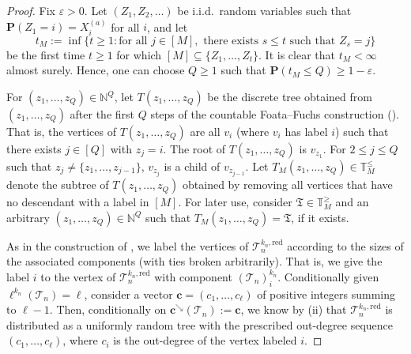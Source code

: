 \documentclass{article}
\theoremstyle{remark}
\newcommand{\bN}{\mathbb{N}}
\newcommand{\bT}{\mathbb{T}}
\newcommand{\cT}{\mathcal{T}}
\newcommand{\fT}{\mathfrak{T}}
\newcommand{\bc}{\mathbf{c}}
\newcommand{\prob}[1]{\mathbf{P}{\left(#1\right)}}
\newcommand{\red}{\mathrm{red}}
\begin{document}
\begin{proof}
Fix $\varepsilon>0$. 
Let $(Z_1,Z_2,\ldots)$ be i.i.d.\ random variables such that $\prob{Z_1=i}=X_i^{(a)}$ for all $i$, and let 
\[
    t_M := \inf\{ t \geq 1 : \text{for all } j \in [M], \text{ there exists } s \leq t \text{ such that } Z_s= j \}
\] 
be the first time $t \geq 1$ for which $[M] \subseteq \{Z_1,\ldots,Z_t\}$. 
It is clear that $t_M<\infty$ almost surely. 
Hence, one can choose $Q \geq 1$ such that $\prob{t_M \leq Q} \geq 1-\varepsilon$.

For $(z_1,\ldots,z_Q) \in \bN^Q$, let $T(z_1,\ldots,z_Q)$ be the discrete tree obtained from $(z_1,\ldots,z_Q)$ after the first $Q$ steps of the countable Foata--Fuchs construction (). 
That is, the vertices of $T(z_1,\ldots,z_Q)$ are all $v_i$ (where $v_i$ has label $i$) such that there exists $j \in [Q]$ with  $z_j=i$.
The root of $T(z_1,\ldots,z_Q)$ is $v_{z_1}$. For $2 \leq j \leq Q$ such that $z_j \neq \{z_1,\ldots,z_{j-1}\}$, $v_{z_j}$ is a child of $v_{z_{j-1}}$. 
Let $T_M(z_1,\ldots,z_Q) \in \bT_M^\le$ denote the subtree of $T(z_1,\ldots,z_Q)$ obtained by removing all vertices that have no descendant with a label in $[M]$.
For later use,
consider $\fT \in \mathbb{T}_M^{\geq}$ and an arbitrary $(z_1, \ldots, z_Q) \in \bN^Q$ such that $T_M(z_1,\ldots,z_Q)=\fT$, if it exists. 

As in the construction of , we label the vertices of $\cT_n^{k_n,\red}$ according to the sizes of the associated components (with ties broken arbitrarily).
That is, we give the label $i$ to the vertex of $\cT_n^{k_n,\red}$ with component $(\cT_n)_i^{k_n}$.
Conditionally given $\ell^{k_n}(\cT_n) = \ell$, consider a vector $\bc = (c_1, \dots, c_\ell)$ of positive integers summing to $\ell-1$. 
Then, conditionally on $\bc^\searrow(\cT_n):= \bc$, we know by  (ii) that $\cT_n^{k_n,\red}$ is distributed as a uniformly random tree with the prescribed out-degree sequence $(c_1,\ldots,c_\ell)$, where $c_i$ is the out-degree of the vertex labeled $i$.


\end{proof}
\end{document}
